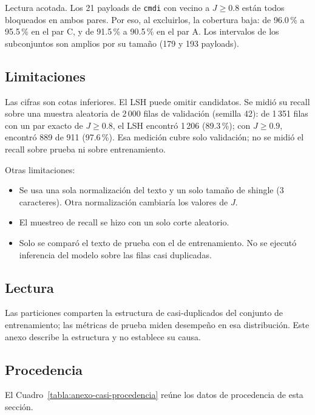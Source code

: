 Lectura acotada. Los 21 payloads de \texttt{cmdi} con vecino a $J \geq 0.8$ están todos bloqueados en ambos pares. Por eso, al excluirlos, la cobertura baja: de 96.0\,\% a 95.5\,\% en el par C, y de 91.5\,\% a 90.5\,\% en el par A. Los intervalos de los subconjuntos son amplios por su tamaño (179 y 193 payloads).

\subsection{Limitaciones}\label{anexo:casi-limitaciones}

Las cifras son cotas inferiores. El LSH puede omitir candidatos. Se midió su recall sobre una muestra aleatoria de 2\,000 filas de validación (semilla 42): de 1\,351 filas con un par exacto de $J \geq 0.8$, el LSH encontró 1\,206 (89.3\,\%); con $J \geq 0.9$, encontró 889 de 911 (97.6\,\%). Esa medición cubre solo validación; no se midió el recall sobre prueba ni sobre entrenamiento.

Otras limitaciones:
\begin{itemize}
\item Se usa una sola normalización del texto y un solo tamaño de shingle (3 caracteres). Otra normalización cambiaría los valores de $J$.
\item El muestreo de recall se hizo con un solo corte aleatorio.
\item Solo se comparó el texto de prueba con el de entrenamiento. No se ejecutó inferencia del modelo sobre las filas casi duplicadas.
\end{itemize}

\subsection{Lectura}\label{anexo:casi-lectura}

Las particiones comparten la estructura de casi-duplicados del conjunto de entrenamiento; las métricas de prueba miden desempeño en esa distribución. Este anexo describe la estructura y no establece su causa.

\subsection{Procedencia}\label{anexo:casi-procedencia}
El Cuadro~\ref{tabla:anexo-casi-procedencia} reúne los datos de procedencia de esta sección.


